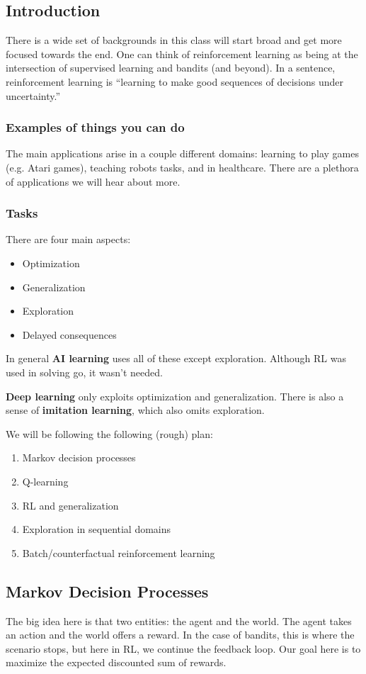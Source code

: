 \documentclass[12pt]{article}
\begin{document}
\subsection{Introduction}
There is a wide set of backgrounds in this class will start broad and get more focused towards the end. One can think of reinforcement learning as being at the intersection of supervised learning and bandits (and beyond). In a sentence, 
reinforcement learning is ``learning to make good sequences of decisions under uncertainty.''

\subsubsection{Examples of things you can do}
The main applications arise in a couple different domains: learning to play games (e.g. Atari games), teaching robots tasks, and in healthcare.
There are a plethora of applications we will hear about more.

\subsubsection{Tasks}
There are four main aspects:
\begin{itemize}
	\item Optimization
	\item Generalization
	\item Exploration 
	\item Delayed consequences
\end{itemize}

In general \textbf{AI learning} uses all of these except exploration. Although RL was used in solving go, it wasn't needed.

\textbf{Deep learning} only exploits optimization and generalization. There is also a sense of \textbf{imitation learning}, which also omits exploration.

We will be following the following (rough) plan:
\begin{enumerate}
	\item Markov decision processes
	\item Q-learning
	\item RL and generalization
	\item Exploration in sequential domains 
	\item Batch/counterfactual reinforcement learning
\end{enumerate}

\subsection{Markov Decision Processes}
The big idea here is that two entities: the agent and the world. The agent takes an action and the world offers a reward. In the case of bandits, this is where the scenario stops,
but here in RL, we continue the feedback loop. Our goal here is to maximize the expected discounted sum of rewards.
\end{document}
